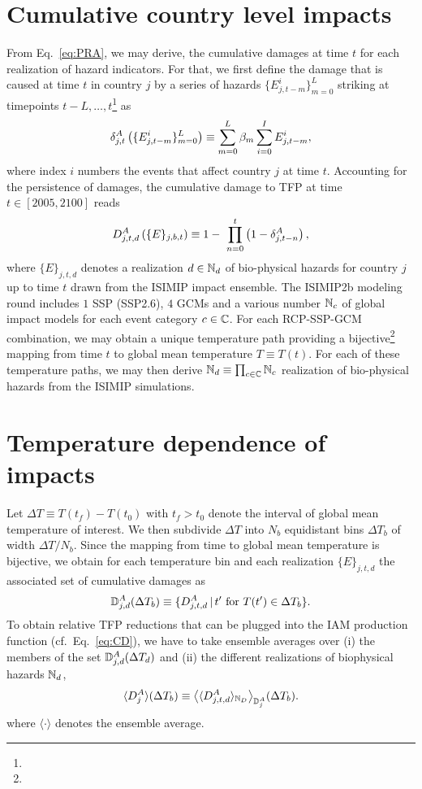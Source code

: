 \documentclass[preprint,3p,authoryear]{elsarticle}
\begin{document}
\section{Cumulative country level impacts}
From Eq.~\eqref{eq:PRA}, we may derive, the cumulative damages at time $t$
for each realization of hazard indicators. For that, we first define the damage that is caused at time $t$ in country $j$ by a series of hazards $\lbrace E_{j,t-m}^i\rbrace_{m=0}^L$ striking at timepoints  $t-L,\ldots,t$\footnote{} as   
\begin{equation}
  \label{eq:dA}
  \delta^A_{j,t}\left(\lbrace E_{j,t-m}^i\rbrace_{m=0}^L\right)\equiv \sum_{m=0}^L\beta_m\sum_{i=0}^IE_{j,t-m}^i,
\end{equation}
where index $i$ numbers the events that affect country $j$ at time $t$. Accounting for the persistence of damages, the cumulative damage to TFP at time $t\in[2005,2100]$ reads
\begin{equation}
  \label{eq:dA}
  \DA_{j,t,d}\left(\lbrace E\rbrace_{j,b,t}\right)\equiv 1 - \ \prod_{n=0}^{t}\left(1-\dA_{j,t-n}\right),
\end{equation}
where $\lbrace E\rbrace_{j,t,d}$ denotes a realization $d\in\mathbb{N}_d$ of bio-physical hazards for country $j$ up to time $t$ drawn from the ISIMIP impact ensemble. The ISIMIP2b modeling round includes $1$ SSP (SSP2.6), $4$ GCMs and a various number $\mathbb{N}_c$ of global impact models for each event category $c\in\mathbb{C}$. For each RCP-SSP-GCM combination, we may obtain a unique temperature path providing a bijective\footnote{} mapping from time $t$ to global mean temperature $T\equiv T(t)$. For each of these temperature paths, we may then derive $\mathbb{N}_d\equiv \prod_{c\in\mathbb{C}} \mathbb{N}_c$ realization of bio-physical hazards from the  ISIMIP simulations.

\section{Temperature dependence of impacts}
Let  $\Delta T\equiv T(t_f)-T(t_0)$ with $t_f>t_0$ denote the interval of global mean temperature of interest. We then subdivide $\Delta T$ into $N_b$ equidistant bins $\Delta T_b$ of width $\Delta T/N_b$. Since the mapping from time to global mean temperature is bijective, we obtain for each temperature bin and each realization $\lbrace E\rbrace_{j,t,d}$ the associated set of cumulative damages as
\begin{equation}
  \label{eq:DDA}
  \mathbb{D}^A_{j,d}(\Delta T_b)\equiv\lbrace D^A_{j,t,d}\, \vert\, t' \text{ for } T(t')\in\Delta T_b \rbrace.
\end{equation}
To obtain relative TFP reductions that can be plugged into the IAM production function (cf.~Eq.~\eqref{eq:CD}), we have to take ensemble averages over (i) the members of the set $\mathbb{D}^A_{j,d}(\Delta T_d)$ and (ii) the different realizations of biophysical hazards $\mathbb{N}_d$,
\begin{equation}
  \label{eq:avDA}
  \langle D^A_{j}\rangle(\Delta T_b)\equiv\big\langle\langle D^A_{j,t,d}\rangle_{\mathbb{N}_D}\big\rangle_{\mathbb{D}^A_{j}}(\Delta T_b).
\end{equation}
where $\langle\cdot\rangle$ denotes the ensemble average.
\end{document}
